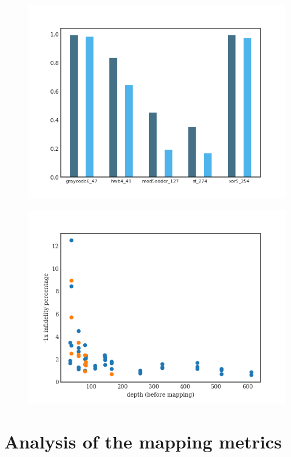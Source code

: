 \label{tab:map_selected_benchs}
\begin{figure}[htbp]
\centering
\includegraphics[width=\textwidth]{figures/f_diff_bar_plot.png}
\caption{\label{fig:org5edca82}
}
\end{figure}
\begin{figure}[htbp]
\centering
\includegraphics[width=\textwidth]{figures/infid_percentage_depth_before_mapping.png}
\caption{\label{fig:org9ff43dd}
}
\end{figure}

\section{Analysis of the mapping metrics}
\label{sec:orgf6e872b}


